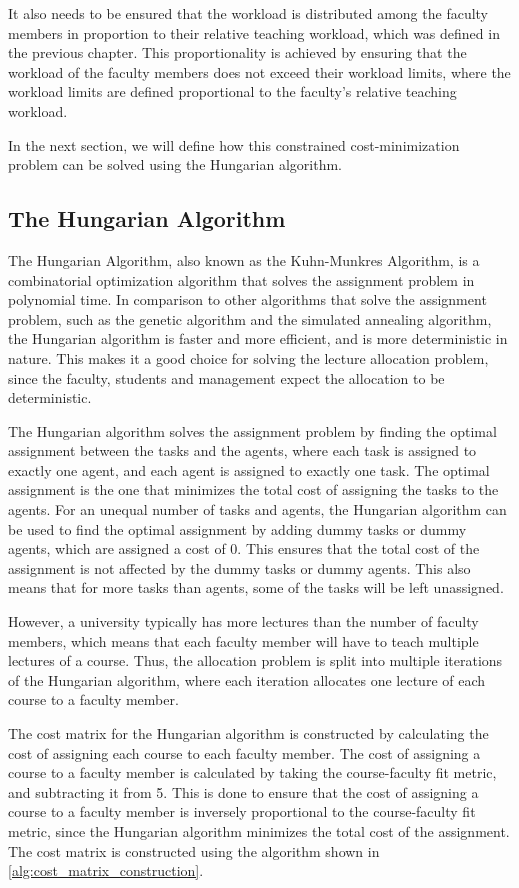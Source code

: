 It also needs to be ensured that the workload is distributed among the faculty members in proportion to their relative teaching workload, which was defined in the previous chapter. This proportionality is achieved by ensuring that the workload of the faculty members does not exceed their workload limits, where the workload limits are defined proportional to the faculty's relative teaching workload.

In the next section, we will define how this constrained cost-minimization problem can be solved using the Hungarian algorithm.

\subsection{The Hungarian Algorithm}

The Hungarian Algorithm, also known as the Kuhn-Munkres Algorithm, is a combinatorial optimization algorithm that solves the assignment problem in polynomial time. In comparison to other algorithms that solve the assignment problem, such as the genetic algorithm and the simulated annealing algorithm, the Hungarian algorithm is faster and more efficient, and is more deterministic in nature. This makes it a good choice for solving the lecture allocation problem, since the faculty, students and management expect the allocation to be deterministic.

The Hungarian algorithm solves the assignment problem by finding the optimal assignment between the tasks and the agents, where each task is assigned to exactly one agent, and each agent is assigned to exactly one task. The optimal assignment is the one that minimizes the total cost of assigning the tasks to the agents. For an unequal number of tasks and agents, the Hungarian algorithm can be used to find the optimal assignment by adding dummy tasks or dummy agents, which are assigned a cost of 0. This ensures that the total cost of the assignment is not affected by the dummy tasks or dummy agents. This also means that for more tasks than agents, some of the tasks will be left unassigned.

However, a university typically has more lectures than the number of faculty members, which means that each faculty member will have to teach multiple lectures of a course. Thus, the allocation problem is split into multiple iterations of the Hungarian algorithm, where each iteration allocates one lecture of each course to a faculty member.

The cost matrix for the Hungarian algorithm is constructed by calculating the cost of assigning each course to each faculty member. The cost of assigning a course to a faculty member is calculated by taking the course-faculty fit metric, and subtracting it from 5. This is done to ensure that the cost of assigning a course to a faculty member is inversely proportional to the course-faculty fit metric, since the Hungarian algorithm minimizes the total cost of the assignment. The cost matrix is constructed using the algorithm shown in \autoref{alg:cost_matrix_construction}.

